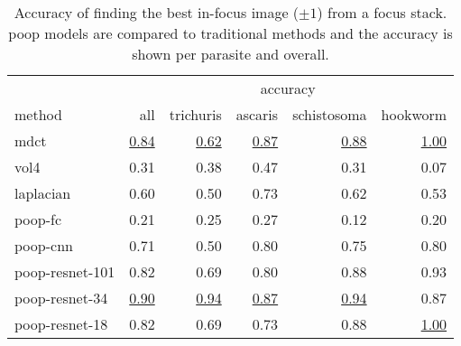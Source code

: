 \begin{table}
    \centering
    \caption[In-focus selection accuracy]{Accuracy of finding the best in-focus image ($\pm 1$) from a focus stack. \Acs{poop} models are compared to traditional methods and the accuracy is shown per parasite and overall.}
    \begin{tabular}{lrrrrr}
        \hline
        \multicolumn{1}{c}{} & \multicolumn{5}{c}{accuracy} \\
        \cline{2-6}
        method & all & trichuris & ascaris & schistosoma & hookworm \\
        \hline
        \acs{mdct}                      & \underline{0.84} & \underline{0.62} & \underline{0.87} & \underline{0.88} & \underline{1.00} \\
        \acs{vol4}                      & 0.31 & 0.38 & 0.47 & 0.31 & 0.07 \\
        \acs{laplacian}                 & 0.60 & 0.50 & 0.73 & 0.62 & 0.53 \\
        \hline
        \acs{poop}-\acs{fc}             & 0.21 & 0.25 & 0.27 & 0.12 & 0.20 \\
        \acs{poop}-\acs{cnn}            & 0.71 & 0.50 & 0.80 & 0.75 & 0.80 \\
        \acs{poop}-\acs{resnet}-101     & 0.82 & 0.69 & 0.80 & 0.88 & 0.93 \\
        \acs{poop}-\acs{resnet}-34      & \underline{0.90} & \underline{0.94} & \underline{0.87} & \underline{0.94} & 0.87 \\
        \acs{poop}-\acs{resnet}-18      & 0.82 & 0.69 & 0.73 & 0.88 & \underline{1.00} \\ 
    \end{tabular}
    \label{tab:Results:Comparison:RelatedWorks:Accuracy}
\end{table}

